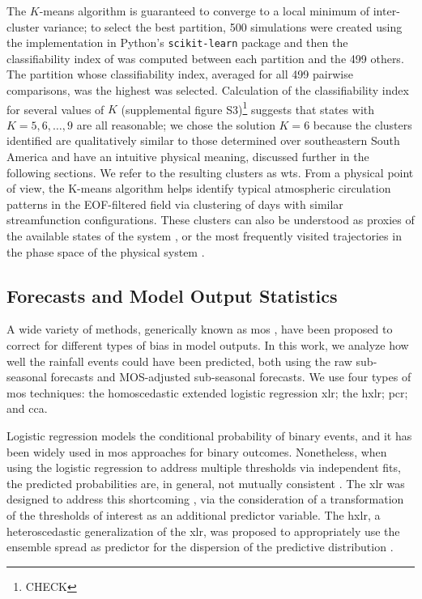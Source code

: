 \documentclass[twocol]{ametsoc}
\begin{document}
The $K$-means algorithm is guaranteed to converge to a local minimum of inter-cluster variance; to select the best partition, 500 simulations were created using the implementation in Python's \texttt{scikit-learn} package \citep{Pedregosa2012} and then the classifiability index of \citet{Michelangeli1995} was computed between each partition and the 499 others.
The partition whose classifiability index, averaged for all 499 pairwise comparisons, was the highest was selected.
Calculation of the classifiability index for several values of $K$ (supplemental figure S3)\footnote{CHECK} suggests that states with $K=5,6,\ldots,9$ are all reasonable; we chose the solution $K=6$ because the clusters identified are qualitatively similar to those determined over southeastern South America \citep{Munoz2015,Munoz2016} and have an intuitive physical meaning, discussed further in the following sections.
We refer to the resulting clusters as \glspl{wt}.
From a physical point of view, the K-means algorithm helps identify typical atmospheric circulation patterns in the EOF-filtered field via clustering of days with similar streamfunction configurations.
These clusters can also be understood as proxies  of the available states of the system , or the most frequently visited trajectories in the phase space of the physical system \citep{Munoz2015,Munoz2016a,Munoz2017}.

\subsection{Forecasts and Model Output Statistics}

A wide variety of methods, generically known as \gls{mos} \citep{Glahn1972}, have been proposed to correct for different types of bias in model outputs.
In this work, we analyze how well the rainfall events could have been predicted, both using the raw sub-seasonal forecasts and  MOS-adjusted sub-seasonal forecasts.
We use  four types of \gls{mos} techniques: the homoscedastic extended logistic regression \gls{xlr}; the \gls{hxlr}; \gls{pcr}; and \gls{cca}.

Logistic regression models the conditional probability of binary events, and it has been widely used in \gls{mos} approaches for binary outcomes.
Nonetheless, when using the logistic regression to address multiple thresholds via independent fits, the predicted probabilities are, in general, not mutually consistent \citep{Messner2014}.
The \gls{xlr} was designed to address this shortcoming \citep{Wilks2009}, via the consideration of a transformation of the thresholds of interest as an additional predictor variable.
The \gls{hxlr}, a heteroscedastic generalization of the \gls{xlr}, was proposed to appropriately use the ensemble spread as predictor for the dispersion of the predictive distribution \citep{Messner2014}.
\end{document}
